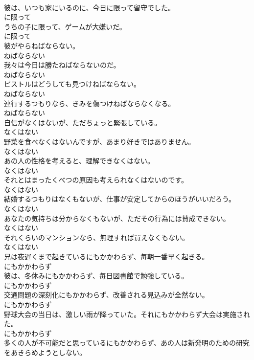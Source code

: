 \documentclass[8pt]{extreport}
\begin{document}
\begin{CJK}{UTF8}{min}
\\	彼は、いつも家にいるのに、今日に限って留守でした。	
\\	に限って	
\\	うちの子に限って、ゲームが大嫌いだ。	
\\	に限って	
\\	彼がやらねばならない。	
\\	ねばならない	
\\	我々は今日は勝たねばならないのだ。	
\\	ねばならない	
\\	ピストルはどうしても見つけねばならない。	
\\	ねばならない	
\\	連行するつもりなら、きみを傷つけねばならなくなる。	
\\	ねばならない	
\\	自信がなくはないが、ただちょっと緊張している。	
\\	なくはない	
\\	野菜を食べなくはないんですが、あまり好きではありません。	
\\	なくはない	
\\	あの人の性格を考えると、理解できなくはない。	
\\	なくはない	
\\	それとはまったくべつの原因も考えられなくはないのです。	
\\	なくはない	
\\	結婚するつもりはなくもないが、仕事が安定してからのほうがいいだろう。	
\\	なくはない	
\\	あなたの気持ちは分からなくもないが、ただその行為には賛成できない。	
\\	なくはない	
\\	それくらいのマンションなら、無理すれば買えなくもない。	
\\	なくはない	
\\	兄は夜遅くまで起きているにもかかわらず、毎朝一番早く起きる。	
\\	にもかかわらず	
\\	彼は、冬休みにもかかわらず、毎日図書館で勉強している。	
\\	にもかかわらず	
\\	交通問題の深刻化にもかかわらず、改善される見込みが全然ない。	
\\	にもかかわらず	
\\	野球大会の当日は、激しい雨が降っていた。それにもかかわらず大会は実施された。	
\\	にもかかわらず	
\\	多くの人が不可能だと思っているにもかかわらず、あの人は新発明のための研究をあきらめようとしない。	

\end{CJK}
\end{document}
